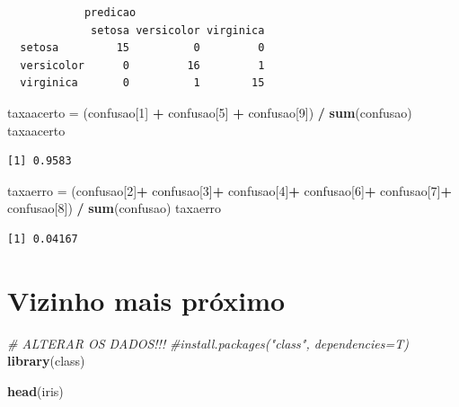 \documentclass[12pt,brazil,oneside]{book}
\newenvironment{Shaded}{\begin{snugshade}}{\end{snugshade}}
\newcommand{\CommentTok}[1]{\textcolor[rgb]{0.56,0.35,0.01}{\textit{#1}}}
\newcommand{\DecValTok}[1]{\textcolor[rgb]{0.00,0.00,0.81}{#1}}
\newcommand{\KeywordTok}[1]{\textcolor[rgb]{0.13,0.29,0.53}{\textbf{#1}}}
\newcommand{\NormalTok}[1]{#1}
\newcommand{\OperatorTok}[1]{\textcolor[rgb]{0.81,0.36,0.00}{\textbf{#1}}}
\newcommand{\StringTok}[1]{\textcolor[rgb]{0.31,0.60,0.02}{#1}}
\begin{document}
\begin{verbatim}
            predicao
             setosa versicolor virginica
  setosa         15          0         0
  versicolor      0         16         1
  virginica       0          1        15
\end{verbatim}

\begin{Shaded}
\begin{Highlighting}[]
\NormalTok{taxaacerto =}\StringTok{ }\NormalTok{(confusao[}\DecValTok{1}\NormalTok{] }\OperatorTok{+}\StringTok{ }\NormalTok{confusao[}\DecValTok{5}\NormalTok{] }\OperatorTok{+}\StringTok{ }\NormalTok{confusao[}\DecValTok{9}\NormalTok{]) }\OperatorTok{/}\StringTok{ }\KeywordTok{sum}\NormalTok{(confusao)}
\NormalTok{taxaacerto}
\end{Highlighting}
\end{Shaded}

\begin{verbatim}
[1] 0.9583
\end{verbatim}

\begin{Shaded}
\begin{Highlighting}[]
\NormalTok{taxaerro =}\StringTok{ }\NormalTok{(confusao[}\DecValTok{2}\NormalTok{]}\OperatorTok{+}\StringTok{ }
\StringTok{            }\NormalTok{confusao[}\DecValTok{3}\NormalTok{]}\OperatorTok{+}
\StringTok{            }\NormalTok{confusao[}\DecValTok{4}\NormalTok{]}\OperatorTok{+}
\StringTok{            }\NormalTok{confusao[}\DecValTok{6}\NormalTok{]}\OperatorTok{+}
\StringTok{            }\NormalTok{confusao[}\DecValTok{7}\NormalTok{]}\OperatorTok{+}
\StringTok{            }\NormalTok{confusao[}\DecValTok{8}\NormalTok{]) }\OperatorTok{/}\StringTok{ }\KeywordTok{sum}\NormalTok{(confusao)}
\NormalTok{taxaerro}
\end{Highlighting}
\end{Shaded}

\begin{verbatim}
[1] 0.04167
\end{verbatim}

\hypertarget{vizinho-mais-proximo}{%
\section{Vizinho mais próximo}\label{vizinho-mais-proximo}}

\begin{Shaded}
\begin{Highlighting}[]
\CommentTok{# ALTERAR OS DADOS!!!}
\CommentTok{#install.packages("class", dependencies=T)}
\KeywordTok{library}\NormalTok{(class)}

\KeywordTok{head}\NormalTok{(iris)}
\end{Highlighting}
\end{Shaded}
\end{document}
